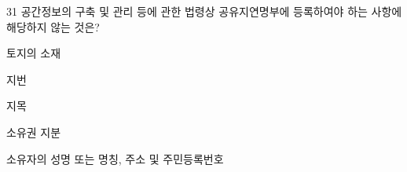 \begin{question}{31}
공간정보의 구축 및 관리 등에 관한 법령상 공유지연명부에 등록하여야 하는 사항에 해당하지 않는 것은?
\begin{choices}
  \item 토지의 소재
  \item 지번
  \item 지목
  \item 소유권 지분
  \item 소유자의 성명 또는 명칭, 주소 및 주민등록번호
\end{choices}
\end{question}
